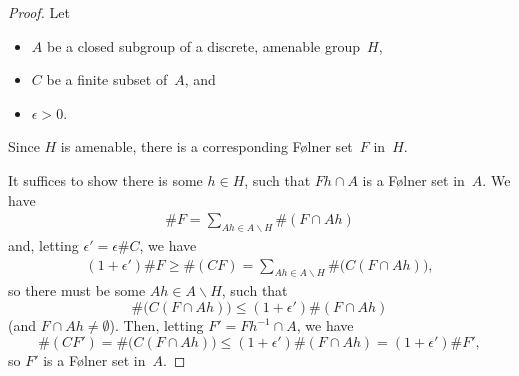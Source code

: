 \begin{proof}
Let
\noprelistbreak
	\begin{itemize}
	\item $A$ be a closed subgroup of a discrete, amenable group~$H$,
	\item $C$ be a finite subset of~$A$,
	and
	\item $\epsilon > 0$.
	\end{itemize}
Since $H$ is amenable, there is a corresponding F\o lner set~$F$ in~$H$. 

It suffices to show there is some $h \in H$, such that $Fh \cap A$ is a F\o lner set in~$A$.
We have
	\begin{align*}
	\#F
	= \sum_{Ah \in A \backslash H} \# (F \cap Ah)
	\end{align*}
and, letting $\epsilon' = \epsilon \#C$, we have
	\begin{align*}
	(1 + \epsilon') \#F
	\ge \#(C F) 
	= \sum_{Ah \in A \backslash H} \# \bigl( C (F \cap Ah) \bigr)
	, \end{align*}
so there must be some $Ah  \in A \backslash H$, such that 
	$$ \# \bigl( C (F \cap Ah) \bigr) \le (1 + \epsilon') \# (F \cap Ah)  $$
(and $F \cap Ah \neq \emptyset$). Then, letting $F' = Fh^{-1} \cap A$, we have
	$$ \# (CF') = \# \bigl( C (F \cap Ah) \bigr) \le (1 + \epsilon') \# (F \cap Ah) = (1 + \epsilon') \#F' ,$$
so $F'$ is a F\o lner set in~$A$.
\end{proof}
 
 
 



